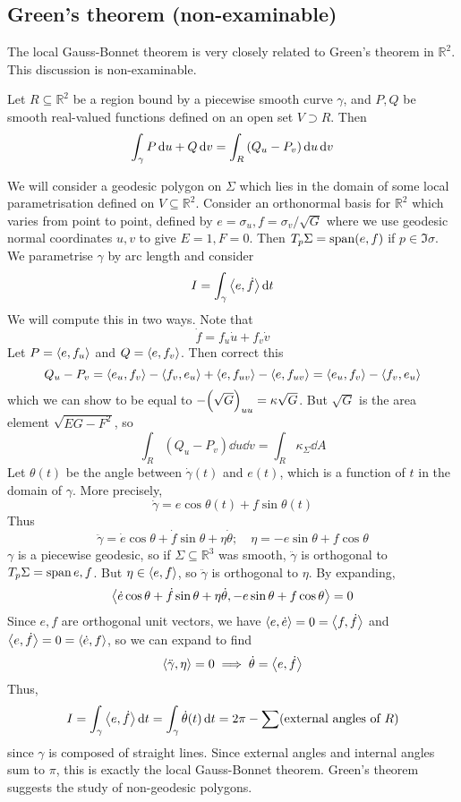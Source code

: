 \subsection{Green's theorem (non-examinable)}
The local Gauss-Bonnet theorem is very closely related to Green's theorem in \( \mathbb R^2 \).
This discussion is non-examinable.
\begin{theorem}
	Let \( R \subseteq \mathbb R^2 \) be a region bound by a piecewise smooth curve \( \gamma \), and \( P, Q \) be smooth real-valued functions defined on an open set \( V \supset R \).
	Then
	\[ \int_\gamma P \dd{u}+ Q \dd{v} = \int_R \qty(Q_u - P_v) \dd{u} \dd{v} \]
\end{theorem}
We will consider a geodesic polygon on \( \Sigma \) which lies in the domain of some local parametrisation defined on \( V \subseteq \mathbb R^2 \).
Consider an orthonormal basis for \( \mathbb R^2 \) which varies from point to point, defined by \( e = \sigma_u, f = \sigma_v/\sqrt{G} \) where we use geodesic normal coordinates \( u,v \) to give \( E = 1, F = 0 \).
Then \( T_p \Sigma = \operatorname{span}(e,f) \) if \( p \in \Im \sigma \).
We parametrise \( \gamma \) by arc length and consider
\[ I = \int_\gamma \left\langle{e,\dot f}\right\rangle \dd{t} \]
We will compute this in two ways.
Note that
\[ \dot f = f_u \dot u + f_v \dot v \]
Let \( P = \left\langle{e,f_u}\right\rangle \) and \( Q = \left\langle{e,f_v}\right\rangle \).
Then
\todo correct this
\[ Q_u - P_v = \left\langle{e_u, f_v}\right\rangle - \left\langle{f_v, e_u}\right\rangle + \left\langle{e, f_{uv}}\right\rangle - \left\langle{e,f_{uv}}\right\rangle = \left\langle{e_u, f_v}\right\rangle - \left\langle{f_v, e_u}\right\rangle \]
which we can show to be equal to \( -\qty(\sqrt{G})_{uu} = \kappa \sqrt{G} \).
But \( \sqrt{G} \) is the area element \( \sqrt{EG-F^2} \), so
\[ \int_R (Q_u - P_v) \dd{u} \dd{v} = \int_R \kappa_\Sigma \dd{A} \]
Let \( \theta(t) \) be the angle between \( \dot\gamma(t) \) and \( e(t) \), which is a function of \( t \) in the domain of \( \gamma \).
More precisely,
\[ \dot \gamma = e \cos \theta(t) + f \sin \theta(t) \]
Thus
\[ \ddot \gamma = \dot e \cos \theta + \dot f \sin \theta + \eta \dot \theta;\quad \eta = -e\sin \theta + f \cos \theta \]
\( \gamma \) is a piecewise geodesic, so if \( \Sigma \subseteq \mathbb R^3 \) was smooth, \( \ddot \gamma \) is orthogonal to \( T_p \Sigma = \operatorname{span}{e,f} \).
But \( \eta \in \langle{} e,f \rangle \), so \( \ddot \gamma \) is orthogonal to \( \eta \).
By expanding,
\[ \left\langle{\dot e \cos \theta + \dot f \sin \theta + \eta \dot \theta, -e\sin\theta + f\cos \theta}\right\rangle = 0\]
Since \( e, f \) are orthogonal unit vectors, we have \( \left\langle{e,\dot e}\right\rangle = 0 = \left\langle{f,\dot f}\right\rangle \) and \( \left\langle{e,\dot f}\right\rangle = 0 = \left\langle{\dot e, f}\right\rangle \), so we can expand to find
\[ \left\langle{\ddot \gamma,\eta}\right\rangle = 0 \implies \dot \theta = \left\langle{e,\dot f}\right\rangle \]
Thus,
\[ I = \int_\gamma \left\langle{e,\dot f}\right\rangle \dd{t} = \int_\gamma \dot \theta(t) \dd{t} = 2\pi - \sum(\text{external angles of } R) \]
since \( \gamma \) is composed of straight lines.
Since external angles and internal angles sum to \( \pi \), this is exactly the local Gauss-Bonnet theorem.
Green's theorem suggests the study of non-geodesic polygons.

